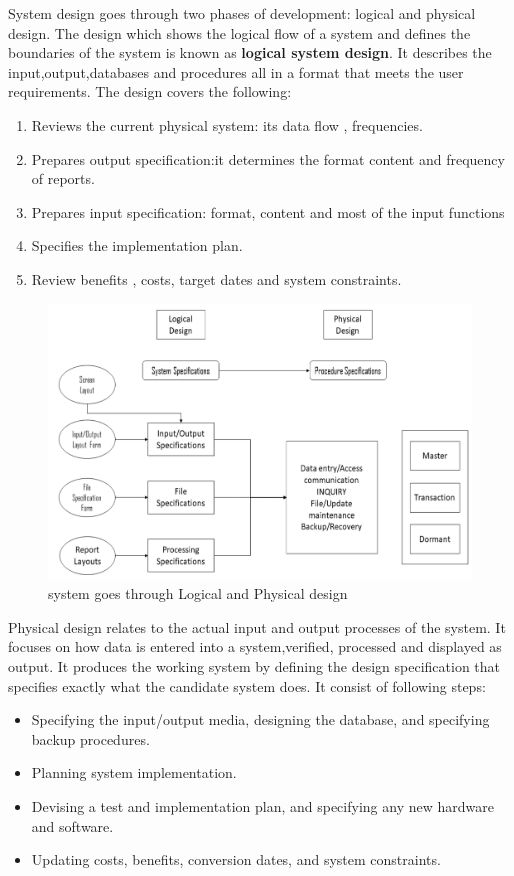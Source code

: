 \documentclass[a4paper,12pt]{report}
\begin{document}
System design goes through two phases of development: logical and physical design. The design which shows the logical flow of a system and defines the boundaries of the system is known as \textbf{logical system design}. It describes the input,output,databases and procedures all in a format that meets the user requirements. The design covers the following: 
\begin{enumerate}
	\item	Reviews the current physical system: its data flow , frequencies.
	\item 	Prepares output specification:it determines the format content and frequency of reports.
	\item 	Prepares input specification: format, content and most of the input functions
	\item 	Specifies the implementation plan.
	\item	Review benefits , costs, target dates and system constraints.
\end{enumerate}
\begin{figure}[h]
	\centering
	\includegraphics[width=0.7\linewidth]{9_1}
	\caption{system goes through Logical and Physical design}
	\label{fig:92}
\end{figure}
Physical design relates to the actual input and output processes of the system. It focuses on how data is entered into a system,verified, processed and displayed as output. It produces the working system by defining the design specification that specifies exactly what the candidate system does. It consist of following steps:	

\begin{itemize}
	\item Specifying the input/output media, designing the database, and specifying    backup procedures.
	\item  Planning system implementation.
	\item  Devising a test and implementation plan, and specifying any new hardware         and software.
	\item  Updating costs, benefits, conversion dates, and system constraints.
	
\end{itemize}
\end{document}
